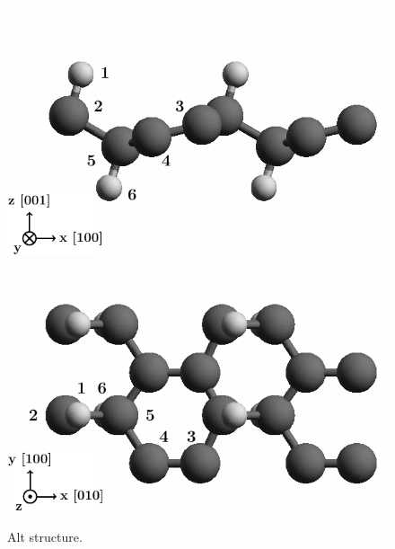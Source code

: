 \documentclass[prb,11pt,tightenlines,twocolumn,aps]{revtex4-1}
\begin{document}
\begin{figure}[ht!]
    \centering
    \includegraphics[width=\linewidth]{figures/altstruc2}
    \\
    \includegraphics[width=\linewidth]{figures/altstruc1}
    \caption{Alt structure.}
    \label{fig:alt-struc}
\end{figure}
\blindtext
\blindtext

\blindtext

\end{document}
